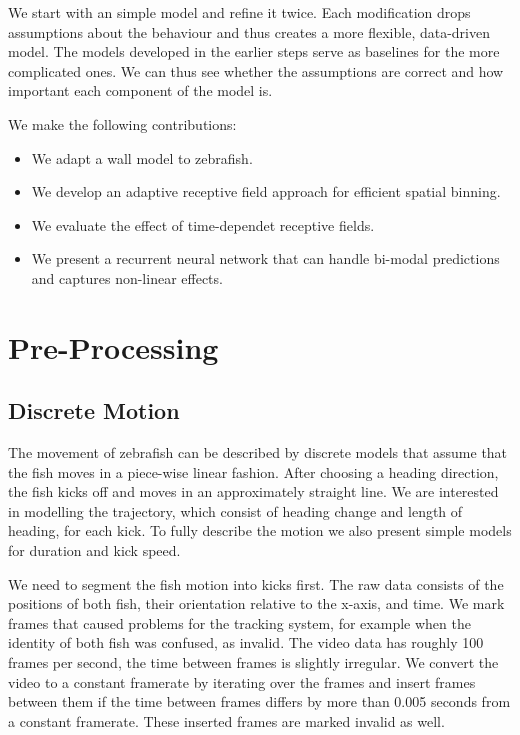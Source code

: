 \documentclass[nobib]{tufte-handout}
\begin{document}
We start with an simple model and refine it twice.
Each modification drops assumptions about the behaviour and thus creates a more flexible, data-driven model.
The models developed in the earlier steps serve as baselines for the more complicated ones.
We can thus see whether the assumptions are correct and how important each component of the model is.

We make the following contributions:
\begin{itemize}
\item We adapt a wall model to zebrafish.
\item We develop an adaptive receptive field approach for efficient spatial binning.
\item We evaluate the effect of time-dependet receptive fields.
\item We present a recurrent neural network that can handle bi-modal predictions and captures non-linear effects.

\end{itemize}
\section{Pre-Processing}

\subsection{Discrete Motion}
The movement of zebrafish can be described by discrete models that assume that the fish moves in a piece-wise linear fashion.
After choosing a heading direction, the fish kicks off and moves in an approximately straight line.
We are interested in modelling the trajectory, which consist of heading change and length of heading, for each kick.
To fully describe the motion we also present simple models for duration and kick speed.

We need to segment the fish motion into kicks first.
The raw data consists of the positions of both fish, their orientation relative to the x-axis, and time.
We mark frames that caused problems for the tracking system, for example when the identity of both fish was confused, as invalid.
The video data has roughly 100 frames per second, the time between frames is slightly irregular.
We convert the video to a constant framerate by iterating over the frames and insert frames between them if the time between frames differs by more than 0.005 seconds from a constant framerate.
These inserted frames are marked invalid as well.
\end{document}
